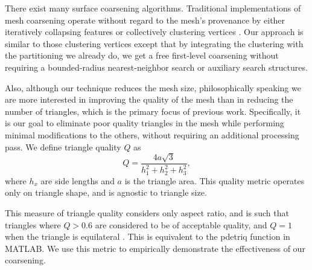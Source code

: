\documentclass[10pt,journal,cspaper,compsoc]{IEEEtran}
\begin{document}

There exist many surface coarsening algorithms.  Traditional
implementations of mesh coarsening operate without regard to the mesh's
provenance by either iteratively collapsing features \cite{Potter2011} or
collectively clustering vertices \cite{DeCoro2007}.  Our approach is
similar to those clustering vertices except that by integrating the
clustering with the partitioning we already do, we get a free first-level
coarsening without requiring a bounded-radius nearest-neighbor search or
auxiliary search structures.



Also, although our technique reduces the mesh size, philosophically
speaking we are more interested in improving the quality of the mesh than
in reducing the number of triangles, which is the primary focus of previous
work.  Specifically, it is our goal to eliminate poor quality triangles in
the mesh while performing minimal modifications to the others, without
requiring an additional processing pass. We define triangle quality $Q$ as
\begin{equation}
\label{eq:quality}
	Q = \frac{4a\sqrt{3}}{h_1^2 + h_2^2 + h_3^2},
\end{equation}
where $h_x$ are side lengths and $a$ is the triangle area. This quality
metric operates only on triangle shape, and is agnostic to triangle size.

This measure of triangle quality considers only aspect ratio, and is such
that triangles where $Q > 0.6$ are considered to be of acceptable quality,
and $Q = 1$ when the triangle is equilateral \cite{Bank2003}. This is
equivalent to the pdetriq function in MATLAB.  We use this metric to
empirically demonstrate the effectiveness of our coarsening.
\end{document}
